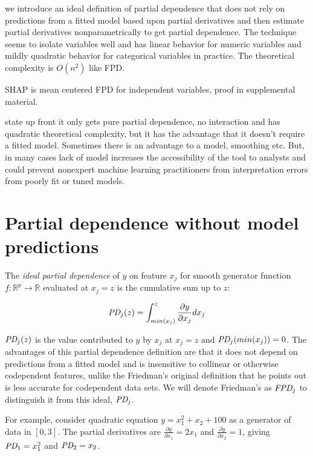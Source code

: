 \documentclass{article}
\begin{document}
we introduce an ideal definition of partial dependence that does not rely on predictions from a fitted model based upon partial derivatives and then estimate partial derivatives nonparametrically to get partial dependence. The technique seems to isolate variables well and has linear behavior for numeric variables and mildly quadratic behavior for categorical variables in practice. The theoretical complexity is $O(n^2)$ like FPD.

SHAP is mean centered FPD for independent variables, proof in supplemental material.

state up front it only gets pure partial dependence, no interaction and has quadratic theoretical complexity, but it has the advantage that it doesn't require a fitted model.  Sometimes there is an advantage to a model, smoothing etc. But, in many cases lack of model increases the accessibility of the tool to analysts and could prevent nonexpert machine learning practitioners from interpretation errors from poorly fit or tuned models.

\section{Partial dependence without model predictions}

 The {\em ideal partial dependence} of $y$ on feature $x_j$ for smooth generator function $f:\mathbb{R}^{p} \rightarrow \mathbb{R}$ evaluated at $x_j = z$ is the cumulative sum up to $z$:

\begin{equation}\label{eq:pd}
\text{\it PD}_j(z) = \int_{min(x_j)}^z \frac{\partial y}{\partial x_j} dx_j
\end{equation}

$\text{\it PD}_j(z)$ is the value contributed to $y$ by $x_j$ at $x_j = z$ and $\text{\it PD}_j(min(x_j))=0$. The advantages of this partial dependence definition are that it does not depend on predictions from a fitted model and is insensitive to collinear or otherwise codependent features, unlike the Friedman's original definition that he points out is less accurate for codependent data sets. We will denote Friedman's as $\text{\it FPD}_j$ to distinguish it from this ideal, $\text{\it PD}_j$.

For example, consider quadratic equation $y = x_1^2 + x_2 + 100$ as a generator of data in $[0,3]$. The partial derivatives are $\frac{\partial y}{\partial x_1} = 2 x_1$ and $\frac{\partial y}{\partial x_2} = 1$, giving $\text{\it PD}_1 = x_1^2$ and $\text{\it PD}_2 = x_2$. 
\end{document}
